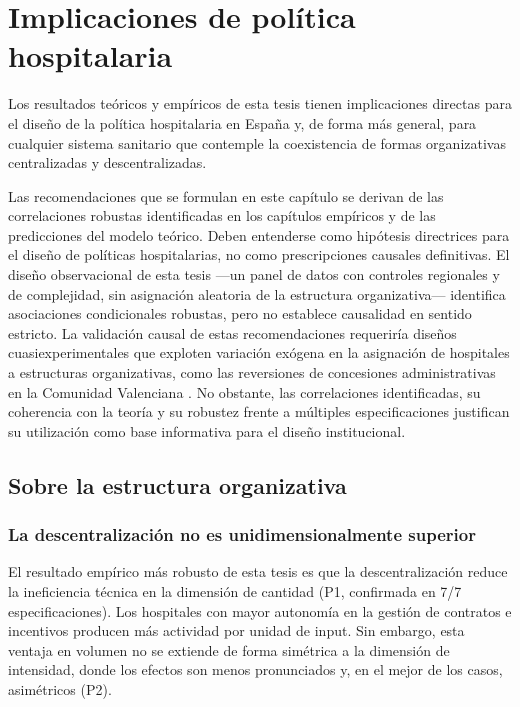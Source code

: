 ﻿\chapter{Implicaciones de política hospitalaria}
\label{ch:politica}

Los resultados teóricos y empíricos de esta tesis tienen implicaciones directas para el diseño de la política hospitalaria en España y, de forma más general, para cualquier sistema sanitario que contemple la coexistencia de formas organizativas centralizadas y descentralizadas.

Las recomendaciones que se formulan en este capítulo se derivan de las correlaciones robustas identificadas en los capítulos empíricos y de las predicciones del modelo teórico. Deben entenderse como hipótesis directrices para el diseño de políticas hospitalarias, no como prescripciones causales definitivas. El diseño observacional de esta tesis ---un panel de datos con controles regionales y de complejidad, sin asignación aleatoria de la estructura organizativa--- identifica asociaciones condicionales robustas, pero no establece causalidad en sentido estricto. La validación causal de estas recomendaciones requeriría diseños cuasiexperimentales que exploten variación exógena en la asignación de hospitales a estructuras organizativas, como las reversiones de concesiones administrativas en la Comunidad Valenciana \citep[véase][para una discusión de estos diseños]{angrist2009}. No obstante, las correlaciones identificadas, su coherencia con la teoría y su robustez frente a múltiples especificaciones justifican su utilización como base informativa para el diseño institucional.

\section{Sobre la estructura organizativa}

\subsection{La descentralización no es unidimensionalmente superior}

El resultado empírico más robusto de esta tesis es que la descentralización reduce la ineficiencia técnica en la dimensión de cantidad (P1, confirmada en 7/7 especificaciones). Los hospitales con mayor autonomía en la gestión de contratos e incentivos producen más actividad por unidad de input. Sin embargo, esta ventaja en volumen no se extiende de forma simétrica a la dimensión de intensidad, donde los efectos son menos pronunciados y, en el mejor de los casos, asimétricos (P2).

